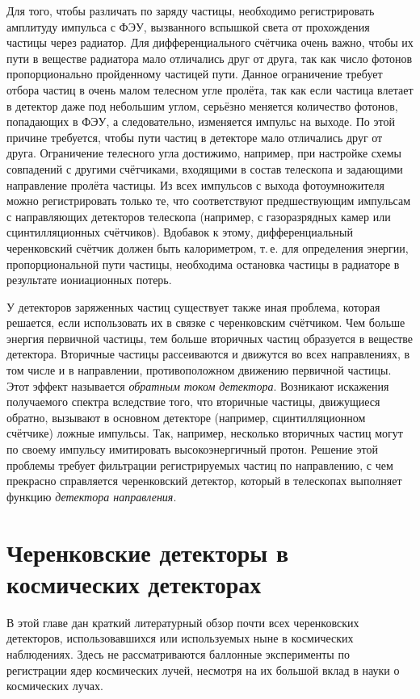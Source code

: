 \documentclass[12pt,a4paper]{report} %
\begin{document}
Для того, чтобы различать по заряду частицы, необходимо регистрировать амплитуду импульса с ФЭУ, вызванного вспышкой света от прохождения частицы через радиатор. 
Для дифференциального счётчика очень важно, чтобы их пути в веществе радиатора мало отличались друг от друга, так как число фотонов пропорционально пройденному частицей пути. 
Данное ограничение требует отбора частиц в очень малом телесном угле пролёта, так как если частица влетает в детектор даже под небольшим углом, серьёзно меняется количество фотонов, попадающих в ФЭУ, а следовательно, изменяется импульс на выходе. 
По этой причине требуется, чтобы пути частиц в детекторе мало отличались друг от друга.
Ограничение телесного угла достижимо, например, при настройке схемы совпадений с другими счётчиками, входящими в состав телескопа и задающими направление пролёта частицы.
Из всех импульсов с выхода фотоумножителя можно регистрировать только те, что соответствуют предшествующим импульсам с направляющих детекторов телескопа (например, с газоразрядных камер или сцинтилляционных счётчиков).
Вдобавок к этому, дифференциальный черенковский счётчик должен быть калориметром, т.\,е. для определения энергии, пропорциональной пути частицы, необходима остановка частицы в радиаторе в результате иониационных потерь.

У детекторов заряженных частиц существует также иная проблема, которая решается, если использовать их в связке с черенковским счётчиком.
Чем больше энергия первичной частицы, тем больше вторичных частиц образуется в веществе детектора.
Вторичные частицы рассеиваются и движутся во всех направлениях, в том числе и в направлении, противоположном движению первичной частицы. 
Этот эффект называется \textit{обратным током детектора}.
Возникают искажения получаемого спектра вследствие того, что вторичные частицы, движущиеся обратно, вызывают в основном детекторе (например, сцинтилляционном счётчике) ложные импульсы.
Так, например, несколько вторичных частиц могут по своему импульсу имитировать высокоэнергичный протон.
Решение этой проблемы требует фильтрации регистрируемых частиц по направлению, с чем прекрасно справляется черенковский детектор, который в телескопах выполняет функцию \textit{детектора направления}.
\chapter{Черенковские детекторы в космических детекторах}
В этой главе дан краткий литературный обзор почти всех черенковских детекторов, использовавшихся или используемых ныне в космических наблюдениях. Здесь не рассматриваются баллонные эксперименты по регистрации ядер космических лучей, несмотря на их большой вклад в науки о космических лучах.
\end{document}
